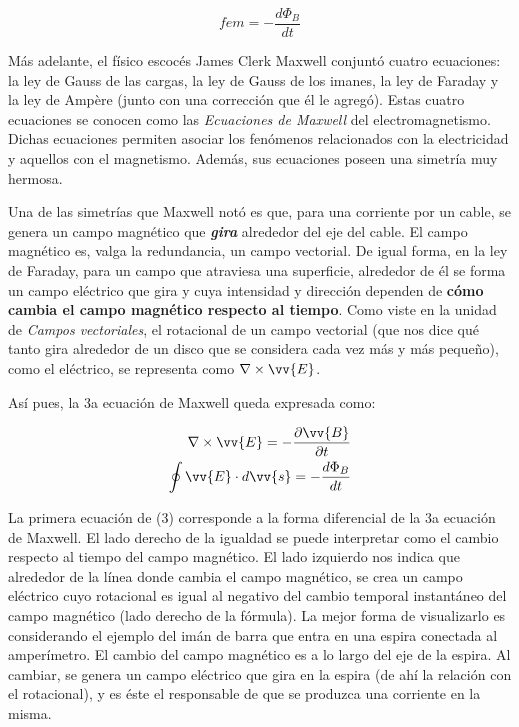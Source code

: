 \documentclass{article}
\begin{document}
\begin{equation}
fem=-\frac{d\Phi_B}{dt}
\end{equation}\bigskip

Más adelante, el físico escocés James Clerk Maxwell conjuntó cuatro ecuaciones: la ley de Gauss de las cargas, la ley de Gauss de los imanes, la ley de Faraday y la ley de Ampère (junto con una corrección que él le agregó). Estas cuatro ecuaciones se conocen como las \emph{Ecuaciones de Maxwell} del electromagnetismo. Dichas ecuaciones permiten asociar los fenómenos relacionados con la electricidad y aquellos con el magnetismo. Además, sus ecuaciones poseen una simetría muy hermosa.\bigskip

Una de las simetrías que Maxwell notó es que, para una corriente por un cable, se genera un campo magnético que \emph{\textbf{gira}} alrededor del eje del cable. El campo magnético es, valga la redundancia, un campo vectorial. De igual forma, en la ley de Faraday, para un campo que atraviesa una superficie, alrededor de él se forma un campo eléctrico que gira y cuya intensidad y dirección dependen de \textbf{cómo cambia el campo magnético respecto al tiempo}. Como viste en la unidad de \emph{Campos vectoriales}, el rotacional de un campo vectorial (que nos dice qué tanto gira alrededor de un disco que se considera cada vez más y más pequeño), como el eléctrico, se representa como $\nabla\times\vv{E}$.\bigskip

Así pues, la 3a ecuación de Maxwell queda expresada como:\bigskip

\begin{equation}
\begin{aligned}
\nabla\times\vv{E}=-\frac{\partial{\vv{B}}}{\partial{t}}\\
\oint\vv{E}\cdot{d}\vv{s}=-\frac{d\Phi_B}{dt}
\end{aligned}
\end{equation}\bigskip

La primera ecuación de (3) corresponde a la forma diferencial de la 3a ecuación de Maxwell. El lado derecho de la igualdad se puede interpretar como el cambio respecto al tiempo del campo magnético. El lado izquierdo nos indica que alrededor de la línea donde cambia el campo magnético, se crea un campo eléctrico cuyo rotacional es igual al negativo del cambio temporal instantáneo del campo magnético (lado derecho de la fórmula). La mejor forma de visualizarlo es considerando el ejemplo del imán de barra que entra en una espira conectada al amperímetro. El cambio del campo magnético es a lo largo del eje de la espira. Al cambiar, se genera un campo eléctrico que gira en la espira (de ahí la relación con el rotacional), y es éste el responsable de que se produzca una corriente en la misma.\bigskip
\end{document}

